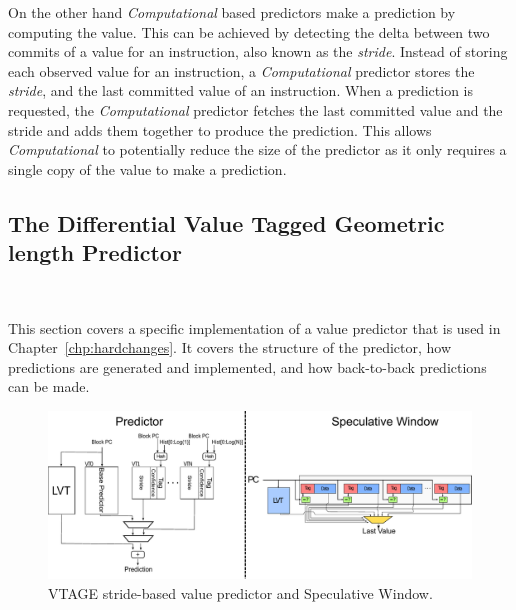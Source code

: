 On the other hand \textit{Computational} based predictors make a prediction by computing the value.
This can be achieved by detecting the delta between two commits of a value for an instruction, also known as the \textit{stride}.
Instead of storing each observed value for an instruction, a \textit{Computational} predictor stores the \textit{stride}, and the last committed value of an instruction.
When a prediction is requested, the \textit{Computational} predictor fetches the last committed value and the stride and adds them together to produce the prediction.
This allows \textit{Computational} to potentially reduce the size of the predictor as it only requires a single copy of the value to make a prediction. 


\subsection{The Differential Value Tagged Geometric length Predictor}~\label{chp:bck:vtage}

This section covers a specific implementation of a value predictor that is used in Chapter~\ref{chp:hardchanges}.
It covers the structure of the predictor, how predictions are generated and implemented, and how back-to-back predictions can be made.

\begin{figure}[t]
    \centering
    \includegraphics[width=1\textwidth]{background/graphics/valuepred.pdf}

    \caption{VTAGE stride-based value predictor and Speculative Window.}
    \label{fig:stride_over}
	\vspace{-1em}
\end{figure}
